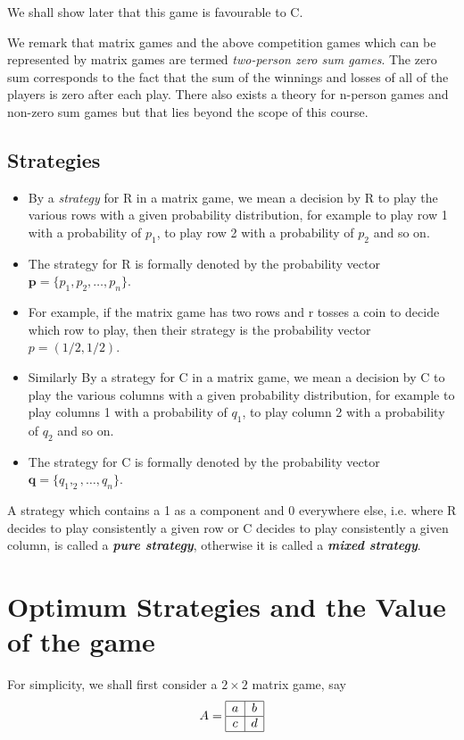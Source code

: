 \documentclass[]{report}
\begin{document}
We shall show later that this game is favourable to C.

We remark that matrix games and the above competition games which can be represented
by matrix games are termed \textit{two-person zero sum games}.
The zero sum corresponds to the fact that the sum of the winnings and losses of all of the players
is zero after each play.
There also exists a theory for n-person games and non-zero sum games but that lies beyond the scope of this course.
\subsection{Strategies}
\begin{itemize}
\item By a \textit{strategy} for R in a matrix game, we mean a decision by R to play the various rows with a given probability distribution, for example
 to play row 1 with a probability of $p_1$, to play row 2 with a probability of $p_2$ and so on.
\item The strategy for R is formally denoted by the probability vector $\boldsymbol{p} = \{p_1,p_2,\ldots,p_n\}$.
\item For example, if the matrix game has two rows and r tosses a coin to decide which row to play, then their strategy is the probability vector $p=(1/2,1/2)$.
\item Similarly By a strategy for C in a matrix game, we mean a decision by C to play the various columns with a given probability distribution, for example
 to play columns 1 with a probability of $q_1$, to play column 2 with a probability of $q_2$ and so on.
\item The strategy for C is formally denoted by the probability vector $\boldsymbol{q} = \{q_1,_2,\ldots,q_n\}$.
\end{itemize}
A strategy which contains a 1 as a component and 0 everywhere else, i.e. where R decides to play consistently a given 
row or C decides to play consistently a given column, is called a \textbf{\textit{pure strategy}}, otherwise it is called a \textbf{\textit{mixed strategy}}.
\section{Optimum Strategies and the Value of the game}
For simplicity, we shall first consider a $2 \times 2$ matrix game, say 
\[ A = \begin{array}{|c|c|} \hline
a & b \\ \hline
c & d \\ \hline
\end{array} \]
\end{document}

